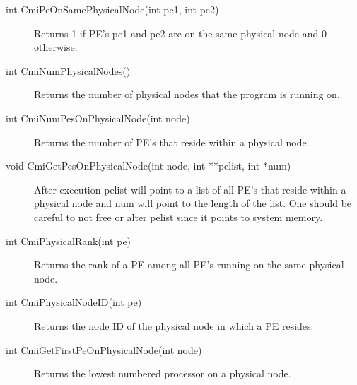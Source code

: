 \begin{description}
\item [int CmiPeOnSamePhysicalNode(int pe1, int pe2)] Returns 1 if PE's pe1 and pe2 are on the same physical node and 0 otherwise.

\item [int CmiNumPhysicalNodes()] Returns the number of physical nodes that the program is running on.

\item [int CmiNumPesOnPhysicalNode(int node)] Returns the number of PE's  that reside within a physical node.

\item [void CmiGetPesOnPhysicalNode(int node, int **pelist, int *num)] After execution pelist will point to a 
list of all PE's that reside within a physical node and num will point to the length of the list. One should be careful
to not free or alter pelist since it points to system memory.

\item [int CmiPhysicalRank(int pe)] Returns the rank of a PE among all PE's running on the same physical node.

\item [int CmiPhysicalNodeID(int pe)] Returns the node ID of the physical node in which a PE resides.

\item [int CmiGetFirstPeOnPhysicalNode(int node)]  Returns the lowest numbered processor on a physical node.
\end{description}






